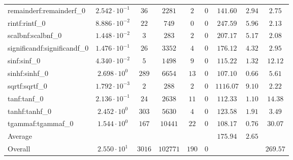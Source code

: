 \begin{tabular}{|l|c|c|c|c|c|c|c|c|}
remainderf:remainderf\_0     & $ 2.542 \cdot 10^{-1} $ & $ 36     $ & $ 2281   $ & $ 2   $ & $ 0   $ & $ 141.60      $ & $ 2.94    $ & $ 2.75    $ \\
rintf:rintf\_0               & $ 8.886 \cdot 10^{-2} $ & $ 22     $ & $ 749    $ & $ 0   $ & $ 0   $ & $ 247.59      $ & $ 5.96    $ & $ 2.13    $ \\
scalbnf:scalbnf\_0           & $ 1.448 \cdot 10^{-2} $ & $ 3      $ & $ 283    $ & $ 2   $ & $ 0   $ & $ 207.17      $ & $ 5.17    $ & $ 2.08    $ \\
significandf:significandf\_0 & $ 1.476 \cdot 10^{-1} $ & $ 26     $ & $ 3352   $ & $ 4   $ & $ 0   $ & $ 176.12      $ & $ 4.32    $ & $ 2.95    $ \\
sinf:sinf\_0                 & $ 4.340 \cdot 10^{-2} $ & $ 5      $ & $ 1498   $ & $ 9   $ & $ 0   $ & $ 115.22      $ & $ 1.32    $ & $ 12.12   $ \\
sinhf:sinhf\_0               & $ 2.698 \cdot 10^{0}  $ & $ 289    $ & $ 6654   $ & $ 13  $ & $ 0   $ & $ 107.10      $ & $ 0.66    $ & $ 5.61    $ \\
sqrtf:sqrtf\_0               & $ 1.792 \cdot 10^{-3} $ & $ 2      $ & $ 288    $ & $ 2   $ & $ 0   $ & $ 1116.07     $ & $ 9.10    $ & $ 2.22    $ \\
tanf:tanf\_0                 & $ 2.136 \cdot 10^{-1} $ & $ 24     $ & $ 2638   $ & $ 11  $ & $ 0   $ & $ 112.33      $ & $ 1.10    $ & $ 14.38   $ \\
tanhf:tanhf\_0               & $ 2.452 \cdot 10^{0}  $ & $ 303    $ & $ 5630   $ & $ 4   $ & $ 0   $ & $ 123.58      $ & $ 1.91    $ & $ 3.49    $ \\
tgammaf:tgammaf\_0           & $ 1.544 \cdot 10^{0}  $ & $ 167    $ & $ 10441  $ & $ 22  $ & $ 0   $ & $ 108.17      $ & $ 0.76    $ & $ 30.07   $ \\
\hline
Average                      & $                     $ & $        $ & $        $ & $     $ & $     $ & $ 175.94      $ & $ 2.65    $ & $         $ \\
\hline
Overall                      & $ 2.550 \cdot 10^{1}  $ & $ 3016   $ & $ 102771 $ & $ 190 $ & $ 0   $ & $             $ & $         $ & $ 269.57  $ \\
\hline
\end{tabular}
